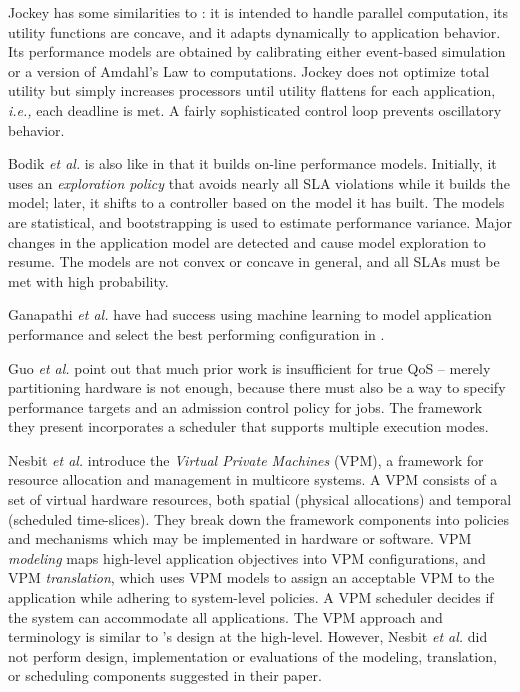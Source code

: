 %
Jockey\cite{Jockey} has some similarities to \pacora: it is intended to handle parallel computation, its utility functions are concave,
and it adapts dynamically to application behavior.
Its performance models are obtained by calibrating either event-based simulation or a version of Amdahl's Law to computations.
Jockey does not optimize total utility but simply increases processors until utility flattens for each application,
\emph{i.e.,} each deadline is met.
A fairly sophisticated control loop prevents oscillatory behavior.

%
Bodik \emph{et al.}\cite{bodik-acdc09} is also like \pacora in that it builds on-line performance models.
Initially, it uses an \emph{exploration policy} that avoids nearly all SLA violations while it builds the model;
later, it shifts to a controller based on the model it has built.
The models are statistical, and bootstrapping is used to estimate performance variance.
Major changes in the application model are detected and cause model exploration to resume.
The models are not convex or concave in general, and all SLAs must be met with high probability.

Ganapathi \emph{et al.} have had success using machine learning to model application performance and select the best performing configuration in \cite{Archana}.

Guo \emph{et al.}\cite{1331730} point out that much prior work is insufficient for true QoS -- merely partitioning hardware is not enough, because there must also be a way to specify performance targets and an admission control policy for jobs.
The framework they present incorporates a scheduler that supports multiple execution modes.



Nesbit \emph{et al.}\cite{1436097} introduce the \emph{Virtual Private Machines} (VPM), a framework for resource allocation and management in multicore systems. A VPM consists of a set of virtual hardware resources, both spatial (physical allocations) and temporal (scheduled time-slices).  They break down the framework components into policies and mechanisms which may be implemented in hardware or software. VPM {\em modeling} maps high-level application objectives into VPM configurations, and VPM {\em translation}, which uses VPM models to assign an acceptable VPM to the application while adhering to system-level policies. A VPM scheduler decides if the system can accommodate all applications. The VPM approach and terminology is similar to \pacora's design at the high-level.  However, Nesbit \emph{et al.} did not perform design, implementation or evaluations of the modeling, translation, or scheduling components suggested in their paper.

